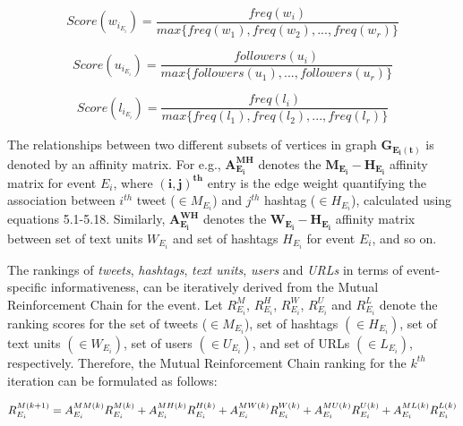 \begin{equation}
Score(w_{i_{E_{i}}}) = \frac{freq(w_{i})}{max\{freq(w_{1}),freq(w_{2}),...,freq(w_{r})\}}
\end{equation}

\begin{equation}
Score(u_{i_{E_{i}}}) = \frac{followers(u_{i})}{max\{followers(u_{1}),...,followers(u_{r})\}}
\end{equation}

\begin{equation}
Score(l_{i_{E_{i}}}) = \frac{freq(l_{i})}{max\{freq(l_{1}),freq(l_{2}),...,freq(l_{r})\}}
\end{equation}


The relationships between two different subsets of vertices in graph $\mathbf{G_{E_{i}(t)}}$ is denoted by an affinity matrix. For e.g., $\mathbf{A_{E_{i}}^{MH}}$ denotes the $\mathbf{M_{E_{i}}-H_{E_{i}}}$ affinity matrix for event $E_{i}$, where $\mathbf{(i,j)^{th}}$ entry is the edge weight quantifying the association between $i^{th}$ tweet ($\in M_{E_{i}}$) and $j^{th}$ hashtag ($\in H_{E_{i}}$), calculated using equations 5.1-5.18. Similarly, $\mathbf{A_{E_{i}}^{WH}}$ denotes the $\mathbf{W_{E_{i}}-H_{E_{i}}}$ affinity matrix between set of text units $W_{E_{i}}$ and set of hashtags $H_{E_{i}}$ for event $E_{i}$, and so on.


The rankings of \textit{tweets}, \textit{hashtags}, \textit{text units}, \textit{users} and \textit{URLs} in terms of event-specific informativeness, can be iteratively derived from the Mutual Reinforcement Chain for the event. Let $R_{{E_{i}}}^{M}$, $R_{{E_{i}}}^{H}$, $R_{{E_{i}}}^{W}$, $R_{{E_{i}}}^{U}$ and $R_{{E_{i}}}^{L}$ denote the ranking scores for the set of tweets ($\in M_{E_{i}}$), set of  hashtags $(\in H_{E_{i}})$, set of text units $(\in W_{E_{i}})$, set of users $(\in U_{E_{i}})$, and set of URLs $(\in L_{E_{i}})$, respectively. Therefore, the Mutual Reinforcement Chain ranking for the $k^{th}$ iteration can be formulated as follows:
 


\begin{equation}
\small R_{{E_{i}}}^{M(k+1)} = A_{E_{i}}^{MM(k)}R_{{E_{i}}}^{M(k)} + A_{E_{i}}^{MH(k)}R_{{E_{i}}}^{H(k)} + A_{E_{i}}^{MW(k)}R_{{E_{i}}}^{W(k)}+ A_{E_{i}}^{MU(k)}R_{{E_{i}}}^{U(k)} + A_{E_{i}}^{ML(k)}R_{{E_{i}}}^{L(k)}
\end{equation}

